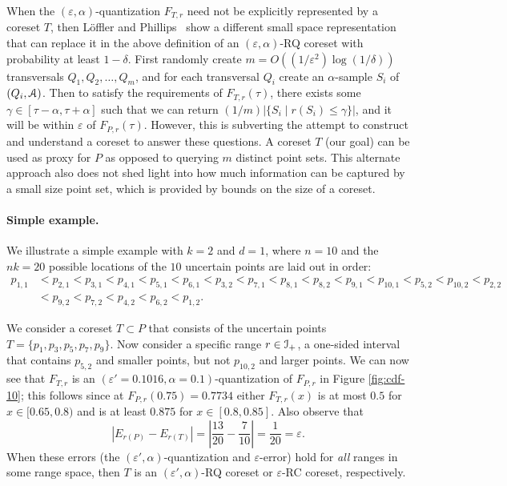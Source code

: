 \documentclass[11pt]{myclass}
\newcommand{\eps}{\varepsilon}
\newcommand{\Eu}[1]{\ensuremath{\EuScript{#1}}}
\newcommand{\RC}{\textsf{RC}\xspace}
\newcommand{\RQ}{\textsf{RQ}\xspace}
\newcommand{\Paragraph}[1]{\paragraph{\sffamily\textbf{#1.}}}
\begin{document}
When the $(\eps,\alpha)$-quantization $F_{T,r}$ need not be explicitly represented by a coreset $T$, then L\"offler and Phillips~\cite{LP09,JLP11} show a different small space representation that can replace it in the above definition of an $(\eps,\alpha)$-\RQ coreset with probability at least $1-\delta$.  First randomly create $m = O((1/\eps^2) \log (1/\delta))$ transversals $Q_1, Q_2, \ldots, Q_m$, and for each transversal $Q_i$ create an $\alpha$-sample $S_i$ of $(Q_i, \Eu{A})$.  Then to satisfy the requirements of $F_{T,r}(\tau)$, there exists some $\gamma \in [\tau-\alpha, \tau + \alpha]$ such that we can return $(1/m) |\{S_i \mid r(S_i) \leq \gamma\}|$, and it will be within $\eps$ of $F_{P,r}(\tau)$.  
However, this is subverting the attempt to construct and understand a coreset to answer these questions.  A coreset $T$ (our goal) can be used as proxy for $P$ as opposed to querying $m$ distinct point sets.  This alternate approach also does not shed light into how much information can be captured by a small size point set, which is provided by bounds on the size of a coreset.  

\Paragraph{Simple example}
We illustrate a simple example with $k=2$ and $d=1$, where $n=10$ and the $nk =20$ possible locations of the $10$ uncertain points are laid out in order:
\begin{align*}
p_{1,1} &< p_{2,1} < p_{3,1} < p_{4,1} < p_{5,1} <  p_{6,1} < p_{3,2} < p_{7,1} 
<  
p_{8,1} < p_{8,2} < p_{9,1} < p_{10,1} < p_{5,2} < p_{10,2} <  p_{2,2}
\\&< 
 p_{9,2}  < p_{7,2} <  p_{4,2} < p_{6,2} <  p_{1,2}.
\end{align*}

We consider a coreset $T \subset P$ that consists of the uncertain points $T = \{p_1, p_3, p_5, p_7, p_9\}$. 
Now consider a specific range $r \in \Eu{I}_+$, a one-sided interval that contains $p_{5,2}$ and smaller points, but not $p_{10,2}$ and larger points.  
We can now see that $F_{T,r}$ is an $(\eps'=0.1016, \alpha=0.1)$-quantization of $F_{P,r}$ in Figure \ref{fig:cdf-10}; this follows since at $F_{P,r}(0.75) = 0.7734$ either $F_{T,r}(x)$ is at most $0.5$ for $x \in [0.65,0.8)$ and is at least $0.875$ for $x \in [0.8,0.85]$.  
Also observe that 
\[
\left|E_{r(P)} - E_{r(T)}\right| = \left|\frac{13}{20} - \frac{7}{10} \right| = \frac{1}{20} = \eps.
\]  
When these errors (the $(\eps',\alpha)$-quantization and $\eps$-error) hold for \emph{all} ranges in some range space, then $T$ is an $(\eps',\alpha)$-\RQ coreset or $\eps$-\RC coreset, respectively.  
\end{document}
